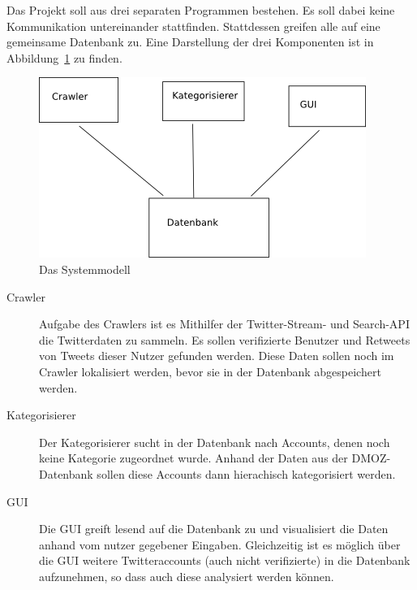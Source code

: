 
Das Projekt soll aus drei separaten Programmen bestehen. Es soll dabei keine Kommunikation untereinander stattfinden. Stattdessen greifen alle auf eine gemeinsame Datenbank zu. Eine Darstellung der drei Komponenten ist in Abbildung~\ref{c:systemmodell} zu finden.

\begin{figure}[h]
	\centering
	\includegraphics{img/systemmodell.png}
	\caption{Das Systemmodell}
	\label{c:systemmodell}
\end{figure}

\begin{description}
	\item[Crawler] Aufgabe des Crawlers ist es Mithilfer der Twitter-Stream- und Search-API die Twitterdaten zu sammeln. Es sollen verifizierte Benutzer und Retweets von Tweets dieser Nutzer gefunden werden. Diese Daten sollen noch im Crawler lokalisiert werden, bevor sie in der Datenbank abgespeichert werden.
	\item[Kategorisierer] Der Kategorisierer sucht in der Datenbank nach Accounts, denen noch keine Kategorie zugeordnet wurde. Anhand der Daten aus der DMOZ-Datenbank sollen diese Accounts dann hierachisch kategorisiert werden.
	\item[GUI] Die GUI greift lesend auf die Datenbank zu und visualisiert die Daten anhand vom nutzer gegebener Eingaben. Gleichzeitig ist es möglich über die GUI weitere Twitteraccounts (auch nicht verifizierte) in die Datenbank aufzunehmen, so dass auch diese analysiert werden können.
\end{description}


